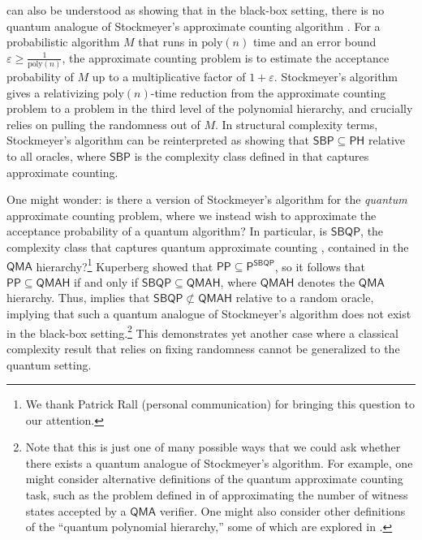 \documentclass[11pt]{article}%
\newcommand{\eps}{\varepsilon}
\newcommand{\poly}{\mathrm{poly}}
\begin{document}
 can also be understood as showing that in the black-box setting, there is no quantum analogue of Stockmeyer's approximate counting algorithm \cite{Sto83}. For a probabilistic algorithm $M$ that runs in $\poly(n)$ time and an error bound $\eps \ge \frac{1}{\poly(n)}$, the approximate counting problem is to estimate the acceptance probability of $M$ up to a multiplicative factor of $1 + \eps$. Stockmeyer's algorithm \cite{Sto83} gives a relativizing $\poly(n)$-time reduction from the approximate counting problem to a problem in the third level of the polynomial hierarchy, and crucially relies on pulling the randomness out of $M$. In structural complexity terms, Stockmeyer's algorithm can be reinterpreted as showing that $\mathsf{SBP} \subseteq \mathsf{PH}$ relative to all oracles, where $\mathsf{SBP}$ is the complexity class defined in \cite{BGM05} that captures approximate counting.

One might wonder: is there a version of Stockmeyer's algorithm for the \textit{quantum} approximate counting problem, where we instead wish to approximate the acceptance probability of a quantum algorithm? In particular, is $\mathsf{SBQP}$, the complexity class that captures quantum approximate counting \cite{Kup15}, contained in the $\mathsf{QMA}$ hierarchy?\footnote{We thank Patrick Rall (personal communication) for bringing this question to our attention.} Kuperberg \cite{Kup15} showed that $\mathsf{PP} \subseteq \mathsf{P}^\mathsf{SBQP}$, so it follows that $\mathsf{PP} \subseteq \mathsf{QMAH}$ if and only if $\mathsf{SBQP} \subseteq \mathsf{QMAH}$, where $\mathsf{QMAH}$ denotes the $\mathsf{QMA}$ hierarchy. Thus,  implies that $\mathsf{SBQP} \not\subset \mathsf{QMAH}$ relative to a random oracle, implying that such a quantum analogue of Stockmeyer's algorithm does not exist in the black-box setting.\footnote{Note that this is just one of many possible ways that we could ask whether there exists a quantum analogue of Stockmeyer's algorithm. For example, one might consider alternative definitions of the quantum approximate counting task, such as the problem defined in \cite{BCGW21} of approximating the number of witness states accepted by a $\mathsf{QMA}$ verifier. One might also consider other definitions of the ``quantum polynomial hierarchy,'' some of which are explored in \cite{GSS+18}.} This demonstrates yet another case where a classical complexity result that relies on fixing randomness cannot be generalized to the quantum setting.
\end{document}
